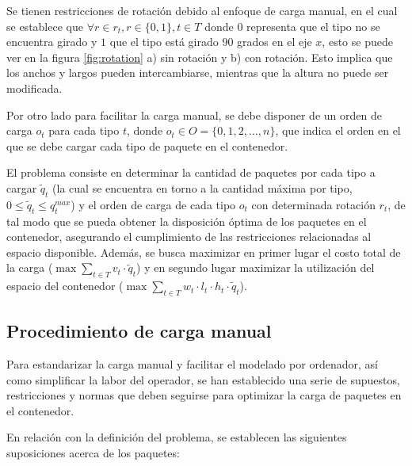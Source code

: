 \documentclass[openany]{article}
\begin{document}
Se tienen restricciones de rotación debido al enfoque de carga manual, en el cual se establece que $\forall r \in r_t, r \in \{0, 1\}, t \in T$ donde $0$ representa que el tipo no se encuentra girado y $1$ que el tipo está girado 90 grados en el eje $x$, esto se puede ver en la figura \ref{fig:rotation} a) sin rotación y b) con rotación. Esto implica que los anchos y largos pueden intercambiarse, mientras que la altura no puede ser modificada.

Por otro lado para facilitar la carga manual, se debe disponer de un orden de carga $o_t$ para cada tipo $t$, donde $o_t \in O = \{0, 1, 2, \ldots, n\}$, que indica el orden en el que se debe cargar cada tipo de paquete en el contenedor.

El problema consiste en determinar la cantidad de paquetes por cada tipo a cargar $\tilde{q}_t$ (la cual se encuentra en torno a la cantidad máxima por tipo, $0 \leq \tilde{q}_t \leq q^{max}_t$) y el orden de carga de cada tipo $o_t$ con determinada rotación $r_t$, de tal modo que se pueda obtener la disposición óptima de los paquetes en el contenedor, asegurando el cumplimiento de las restricciones relacionadas al espacio disponible. Además, se busca maximizar en primer lugar el costo total de la carga ($\max \sum_{t \in T} v_t \cdot \tilde{q}_t$) y en segundo lugar maximizar la utilización del espacio del contenedor ($\max \sum_{t \in T} w_t \cdot l_t \cdot h_t \cdot \tilde{q}_t$).


\subsection{Procedimiento de carga manual}

Para estandarizar la carga manual y facilitar el modelado por ordenador, así como simplificar la labor del operador, se han establecido una serie de supuestos, restricciones y normas que deben seguirse para optimizar la carga de paquetes en el contenedor.

En relación con la definición del problema, se establecen las siguientes suposiciones acerca de los paquetes:
\end{document}
